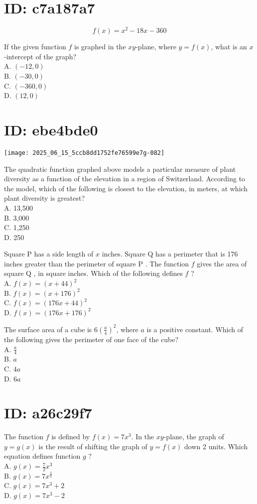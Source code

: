 \section*{ID: c7a187a7}
$$
f(x)=x^{2}-18 x-360
$$

If the given function $f$ is graphed in the $x y$-plane, where $y=f(x)$, what is an $x$-intercept of the graph?\\
A. $(-12,0)$\\
B. $(-30,0)$\\
C. $(-360,0)$\\
D. $(12,0)$

\section*{ID: ebe4bde0}
\begin{center}
\texttt{[image: 2025\_06\_15\_5ccb8dd1752fe76599e7g-082]}
\end{center}

The quadratic function graphed above models a particular measure of plant diversity as a function of the elevation in a region of Switzerland. According to the model, which of the following is closest to the elevation, in meters, at which plant diversity is greatest?\\
A. 13,500\\
B. 3,000\\
C. 1,250\\
D. 250

Square P has a side length of $x$ inches. Square Q has a perimeter that is 176 inches greater than the perimeter of square P . The function $f$ gives the area of square Q , in square inches. Which of the following defines $f$ ?\\
A. $f(x)=(x+44)^{2}$\\
B. $f(x)=(x+176)^{2}$\\
C. $f(x)=(176 x+44)^{2}$\\
D. $f(x)=(176 x+176)^{2}$

The surface area of a cube is $6\left(\frac{a}{4}\right)^{2}$, where $a$ is a positive constant. Which of the following gives the perimeter of one face of the cube?\\
A. $\frac{a}{4}$\\
B. $a$\\
C. $4 a$\\
D. $6 a$

\section*{ID: a26c29f7}
The function $f$ is defined by $f(x)=7 x^{3}$. In the $x y$-plane, the graph of $y=g(x)$ is the result of shifting the graph of $y=f(x)$ down 2 units. Which equation defines function $g$ ?\\
A. $g(x)=\frac{7}{2} x^{3}$\\
B. $g(x)=7 x^{\frac{3}{2}}$\\
C. $g(x)=7 x^{3}+2$\\
D. $g(x)=7 x^{3}-2$

